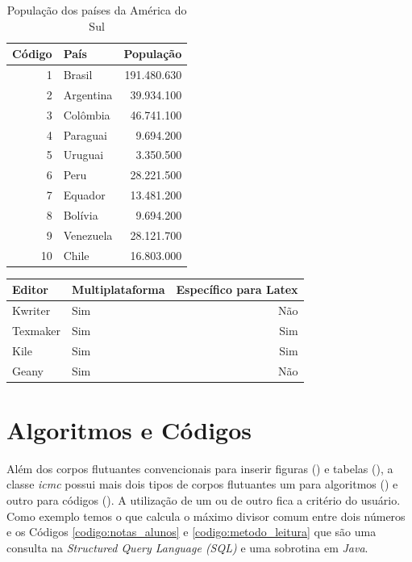 \begin{table}[htb]
\centering
\caption{População dos países da América do Sul} \label{tabela:populacao_america_sul}
\begin{tabular}{r|l|r}        \hline
Código  & País            & População   \\ \hline
1       & Brasil          & 191.480.630 \\
2       & Argentina       &  39.934.100 \\
3       & Colômbia        &  46.741.100 \\
4       & Paraguai        &   9.694.200 \\
5       & Uruguai         &   3.350.500 \\
6       & Peru            &  28.221.500 \\
7       & Equador         &  13.481.200 \\
8       & Bolívia         &   9.694.200 \\
9       & Venezuela       &  28.121.700 \\
10      & Chile           &  16.803.000 \\ \hline
\end{tabular}

\end{table}

\begin{quadro}[htb]
\caption{Editores de Texto Livres}
\label{quadro:editores_texto_livres}
\centering
\begin{tabular}{|l|l|r|}        \hline
Editor     & Multiplataforma & Específico para Latex \\ \hline
Kwriter    & Sim             & Não                   \\
Texmaker   & Sim             & Sim                   \\
Kile       & Sim             & Sim                   \\
Geany      & Sim             & Não                   \\ \hline
\end{tabular}
\end{quadro}

\section{Algoritmos e Códigos}
\label{secao:algoritmos_e_codigos}

Além dos corpos flutuantes convencionais para inserir figuras () e tabelas (), a classe \textit{icmc} possui mais dois tipos de corpos flutuantes um para algoritmos () e outro para códigos (). A utilização de um ou de outro fica a critério do usuário. Como exemplo temos o  que calcula o máximo divisor comum entre dois números e os Códigos \ref{codigo:notas_alunos} e \ref{codigo:metodo_leitura} que são uma consulta na \textit{Structured Query Language (SQL)} e uma sobrotina em \textit{Java}.

